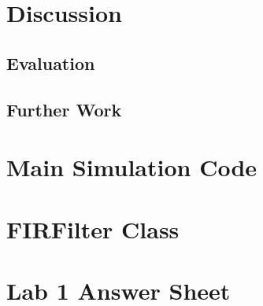 \documentclass[11pt]{article}
\begin{document}
\section{Discussion}
\subsection{Evaluation}
\subsection{Further Work}

\pagebreak



\pagebreak
\appendix
\section{Main Simulation Code}

\pagebreak
\section{FIRFilter Class}

\section{Lab 1 Answer Sheet}
\end{document}
